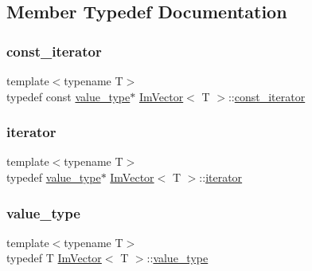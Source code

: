 \subsection{Member Typedef Documentation}
\mbox{\label{class_im_vector_aedeac9c5080f9d6ce96ae837768ee4c4}} 
\subsubsection{\texorpdfstring{const\+\_\+iterator}{const\_iterator}}
{\footnotesize\ttfamily template$<$typename T$>$ \\
typedef const \mbox{\hyperlink{class_im_vector_a8bd77e4e7581d8e5f9e98d7c2f3c2a80}{value\+\_\+type}}$\ast$ \mbox{\hyperlink{class_im_vector}{Im\+Vector}}$<$ T $>$\+::\mbox{\hyperlink{class_im_vector_aedeac9c5080f9d6ce96ae837768ee4c4}{const\+\_\+iterator}}}

\mbox{\label{class_im_vector_a74b5478f1f6fd471cc71219bce483db6}} 
\subsubsection{\texorpdfstring{iterator}{iterator}}
{\footnotesize\ttfamily template$<$typename T$>$ \\
typedef \mbox{\hyperlink{class_im_vector_a8bd77e4e7581d8e5f9e98d7c2f3c2a80}{value\+\_\+type}}$\ast$ \mbox{\hyperlink{class_im_vector}{Im\+Vector}}$<$ T $>$\+::\mbox{\hyperlink{class_im_vector_a74b5478f1f6fd471cc71219bce483db6}{iterator}}}

\mbox{\label{class_im_vector_a8bd77e4e7581d8e5f9e98d7c2f3c2a80}} 
\subsubsection{\texorpdfstring{value\+\_\+type}{value\_type}}
{\footnotesize\ttfamily template$<$typename T$>$ \\
typedef T \mbox{\hyperlink{class_im_vector}{Im\+Vector}}$<$ T $>$\+::\mbox{\hyperlink{class_im_vector_a8bd77e4e7581d8e5f9e98d7c2f3c2a80}{value\+\_\+type}}}



